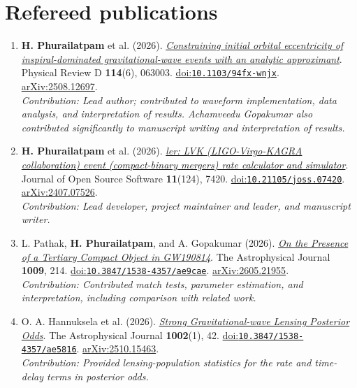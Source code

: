 \documentclass[10pt]{article}
\begin{document}
\section*{Refereed publications}
\begin{enumerate}
\item \textbf{H. Phurailatpam} et al. (2026). \href{https://doi.org/10.1103/94fx-wnjx}{\textit{Constraining initial orbital eccentricity of inspiral-dominated gravitational-wave events with an analytic approximant}}. Physical Review D \textbf{114}(6), 063003. \href{https://doi.org/10.1103/94fx-wnjx}{doi:\nolinkurl{10.1103/94fx-wnjx}}. \href{https://arxiv.org/abs/2508.12697}{arXiv:2508.12697}.\\\emph{Contribution: Lead author; contributed to waveform implementation, data analysis, and interpretation of results. Achamveedu Gopakumar also contributed significantly to manuscript writing and interpretation of results.}
\item \textbf{H. Phurailatpam} et al. (2026). \href{https://doi.org/10.21105/joss.07420}{\textit{ler: LVK (LIGO-Virgo-KAGRA collaboration) event (compact-binary mergers) rate calculator and simulator}}. Journal of Open Source Software \textbf{11}(124), 7420. \href{https://doi.org/10.21105/joss.07420}{doi:\nolinkurl{10.21105/joss.07420}}. \href{https://arxiv.org/abs/2407.07526}{arXiv:2407.07526}.\\\emph{Contribution: Lead developer, project maintainer and leader, and manuscript writer.}
\item L. Pathak, \textbf{H. Phurailatpam}, and A. Gopakumar (2026). \href{https://arxiv.org/abs/2605.21955}{\textit{On the Presence of a Tertiary Compact Object in GW190814}}. The Astrophysical Journal \textbf{1009}, 214. \href{https://doi.org/10.3847/1538-4357/ae9cae}{doi:\nolinkurl{10.3847/1538-4357/ae9cae}}. \href{https://arxiv.org/abs/2605.21955}{arXiv:2605.21955}.\\\emph{Contribution: Contributed match tests, parameter estimation, and interpretation, including comparison with related work.}
\item O. A. Hannuksela et al. (2026). \href{https://doi.org/10.3847/1538-4357/ae5816}{\textit{Strong Gravitational-wave Lensing Posterior Odds}}. The Astrophysical Journal \textbf{1002}(1), 42. \href{https://doi.org/10.3847/1538-4357/ae5816}{doi:\nolinkurl{10.3847/1538-4357/ae5816}}. \href{https://arxiv.org/abs/2510.15463}{arXiv:2510.15463}.\\\emph{Contribution: Provided lensing-population statistics for the rate and time-delay terms in posterior odds.}

\end{enumerate}
\end{document}
